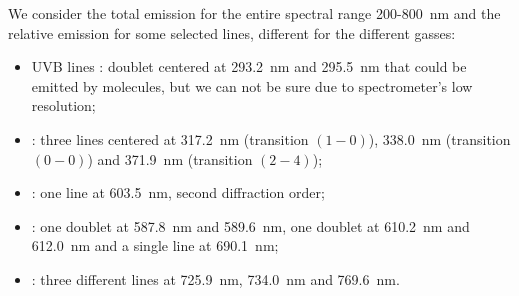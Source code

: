 We consider the total emission for the entire spectral range \num{200}-\SI{800}{\nano\meter} and the relative emission for some selected lines, different for the different gasses:
\begin{itemize}
 \item UVB lines : doublet centered at \SI{293.2}{\nano\meter} and \SI{295.5}{\nano\meter} that could be emitted by  molecules, but we can not be sure due to spectrometer's low resolution;
 \item {} : three lines centered at \SI{317.2}{\nano\meter} (transition $(1-0)$), \SI{338.0}{\nano\meter} (transition $(0-0)$) and \SI{371.9}{\nano\meter} (transition $(2-4)$);
 \item {} : one line at \SI{603.5}{\nano\meter}, second diffraction order;
 \item {} : one doublet at \SI{587.8}{\nano\meter} and \SI{589.6}{\nano\meter}, one doublet at \SI{610.2}{\nano\meter} and \SI{612.0}{\nano\meter} and a single line at \SI{690.1}{\nano\meter};
 \item {} : three different lines at \SI{725.9}{\nano\meter}, \SI{734.0}{\nano\meter} and \SI{769.6}{\nano\meter}.
\end{itemize}


